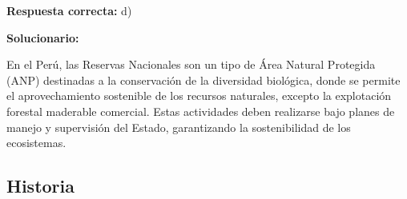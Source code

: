 \begin{enumerate}[resume]
	\textbf{Respuesta correcta:} d)

		\vspace{2mm}
	\textbf{Solucionario:}

	En el Perú, las Reservas Nacionales son un tipo de Área Natural Protegida (ANP) destinadas a la conservación de la diversidad biológica, donde se permite el aprovechamiento sostenible de los recursos naturales, excepto la explotación forestal maderable comercial.
	Estas actividades deben realizarse bajo planes de manejo y supervisión del Estado, garantizando la sostenibilidad de los ecosistemas.

	\vspace{6mm}

\end{enumerate}



\subsection*{Historia}

